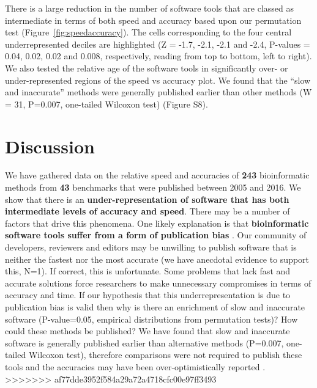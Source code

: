 \documentclass[fleqn,10pt]{SelfArx} %
\begin{document}
There is a large reduction in the number of software tools that are classed as intermediate in terms of both speed and accuracy based upon our permutation test (Figure~\ref{fig:speedaccuracy}). The cells corresponding to the four central underrepresented deciles are highlighted (Z = -1.7, -2.1, -2.1 and -2.4, P-values = 0.04, 0.02, 0.02 and 0.008, respectively, reading from top to bottom, left to right). We also tested the relative age of the software tools in significantly over- or under-represented regions of the speed vs accuracy plot. We found that the “slow and inaccurate” methods were generally published earlier than other methods (W = 31, P=0.007, one-tailed Wilcoxon test) (Figure S8).

\section*{Discussion}
We have gathered data on the relative speed and accuracies of \textbf{{\color{red}243}} bioinformatic methods from \textbf{{\color{red}43}} benchmarks that were published between 2005 and 2016. We show that there is an \textbf{under-representation of software that has both intermediate levels of accuracy and speed}. There may be a number of factors that drive this phenomena. One likely explanation is that \textbf{bioinformatic software tools suffer from a form of publication bias} \cite{Boulesteix2015-am}. Our community of developers, reviewers and editors may be unwilling to publish software that is neither the fastest nor the most accurate (we have anecdotal evidence to support this, N=1). If correct, this is unfortunate. Some problems that lack fast and accurate solutions force researchers to make unnecessary compromises in terms of accuracy and time. If our hypothesis that this underrepresentation is due to publication bias is valid then why is there an enrichment of slow and inaccurate software (P-value=0.05, empirical distributions from permutation tests)? How could these methods be published? We have found that slow and inaccurate software is generally published earlier than alternative methods (P=0.007, one-tailed Wilcoxon test), therefore comparisons were not required to publish these tools and the accuracies may have been over-optimistically reported \cite{Boulesteix2015-nc}.
>>>>>>> af77dde3952f584a29a72a4718cfc00e97ff3493
\end{document}
